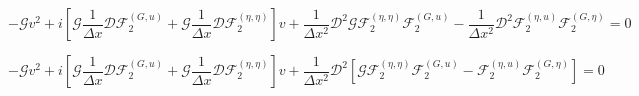 \documentclass[12pt]{article}
\begin{document}
\[ -\mathcal{G}v^2 + i \left[\mathcal{G} \frac{1}{\Delta x} \mathcal{D}\mathcal{F}_2^{(G,u)} + \mathcal{G}\frac{1}{\Delta x} \mathcal{D}\mathcal{F}_2^{(\eta,\eta)}\right]v + \frac{1}{\Delta x^2} \mathcal{D}^2\mathcal{G}\mathcal{F}_2^{(\eta,\eta)} \mathcal{F}_2^{(G,u)}  - \frac{1}{\Delta x^2} \mathcal{D}^2\mathcal{F}_2^{(\eta,u)} \mathcal{F}_2^{(G,\eta)} = 0\]

\[ -\mathcal{G}v^2 + i \left[\mathcal{G} \frac{1}{\Delta x} \mathcal{D}\mathcal{F}_2^{(G,u)} + \mathcal{G}\frac{1}{\Delta x} \mathcal{D}\mathcal{F}_2^{(\eta,\eta)}\right]v + \frac{1}{\Delta x^2} \mathcal{D}^2\left[\mathcal{G}\mathcal{F}_2^{(\eta,\eta)} \mathcal{F}_2^{(G,u)}  - \mathcal{F}_2^{(\eta,u)} \mathcal{F}_2^{(G,\eta)}\right] = 0\]
\end{document}
